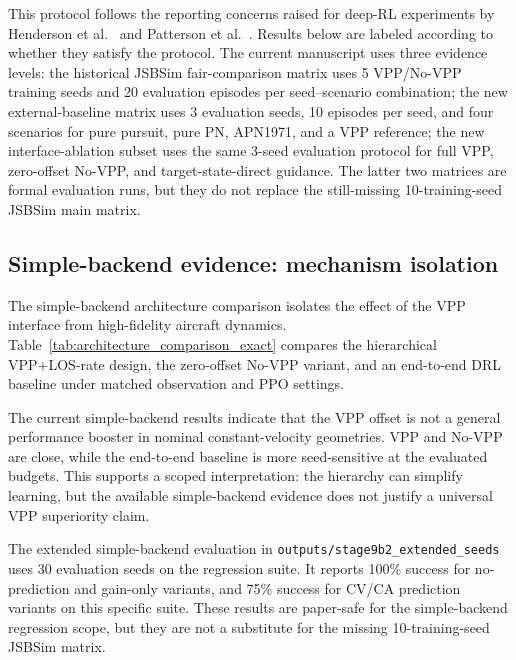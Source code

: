 This protocol follows the reporting concerns raised for deep-RL experiments by Henderson et al.~\cite{henderson2018deep} and Patterson et al.~\cite{patterson2023empirical}. Results below are labeled according to whether they satisfy the protocol. The current manuscript uses three evidence levels: the historical JSBSim fair-comparison matrix uses 5 VPP/No-VPP training seeds and 20 evaluation episodes per seed--scenario combination; the new external-baseline matrix uses 3 evaluation seeds, 10 episodes per seed, and four scenarios for pure pursuit, pure PN, APN1971, and a VPP reference; the new interface-ablation subset uses the same 3-seed evaluation protocol for full VPP, zero-offset No-VPP, and target-state-direct guidance. The latter two matrices are formal evaluation runs, but they do not replace the still-missing 10-training-seed JSBSim main matrix.

\subsection{Simple-backend evidence: mechanism isolation}\label{sec:architecture}

The simple-backend architecture comparison isolates the effect of the VPP interface from high-fidelity aircraft dynamics. Table~\ref{tab:architecture_comparison_exact} compares the hierarchical VPP+LOS-rate design, the zero-offset No-VPP variant, and an end-to-end DRL baseline under matched observation and PPO settings.



The current simple-backend results indicate that the VPP offset is not a general performance booster in nominal constant-velocity geometries. VPP and No-VPP are close, while the end-to-end baseline is more seed-sensitive at the evaluated budgets. This supports a scoped interpretation: the hierarchy can simplify learning, but the available simple-backend evidence does not justify a universal VPP superiority claim.



The extended simple-backend evaluation in \texttt{outputs/stage9b2\_extended\_seeds} uses 30 evaluation seeds on the regression suite. It reports 100\% success for no-prediction and gain-only variants, and 75\% success for CV/CA prediction variants on this specific suite. These results are paper-safe for the simple-backend regression scope, but they are not a substitute for the missing 10-training-seed JSBSim matrix.


